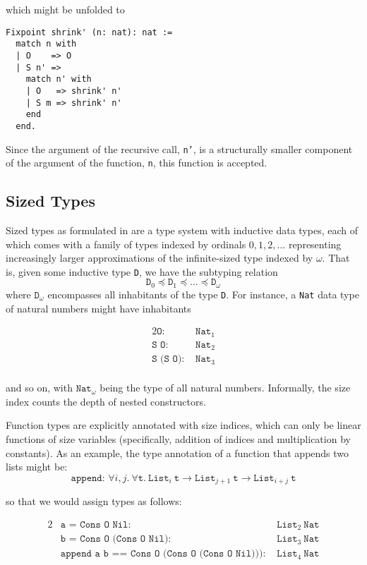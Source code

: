 \documentclass{article}
\begin{document}
which might be unfolded to

\begin{verbatim}
Fixpoint shrink' (n: nat): nat :=
  match n with
  | O    => O
  | S n' =>
    match n' with
    | O   => shrink' n'
    | S m => shrink' n'
    end
  end.
\end{verbatim}

Since the argument of the recursive call, \texttt{n'}, is a structurally smaller component of the argument of the function, \texttt{n}, this function is accepted.

\subsection{Sized Types}
Sized types as formulated in \cite{hughes} are a type system with inductive data types, each of which comes with a family of types indexed by ordinals $0, 1, 2, \dots$ representing increasingly larger approximations of the infinite-sized type indexed by $\omega$. That is, given some inductive type \texttt{D}, we have the subtyping relation
    $$\texttt{D}_0 \preceq \texttt{D}_1 \preceq \dots \preceq \texttt{D}_\omega$$
where $\texttt{D}_\omega$ encompasses all inhabitants of the type \texttt{D}. For instance, a \texttt{Nat} data type of natural numbers might have inhabitants

\begin{alignat*}{2}
    \texttt{O: }        &\texttt{Nat}_1\\
    \texttt{S O: }      &\texttt{Nat}_2\\
    \texttt{S (S O): }  &\texttt{Nat}_3\\
\end{alignat*}

and so on, with $\texttt{Nat}_\omega$ being the type of all natural numbers. Informally, the size index counts the depth of nested constructors.

Function types are explicitly annotated with size indices, which can only be linear functions of size variables (specifically, addition of indices and multiplication by constants). As an example, the type annotation of a function that appends two lists might be:
$$\texttt{append: } \forall i, j.\ \forall \texttt{t}.\ \texttt{List}_i\ \texttt{t} \rightarrow \texttt{List}_{j + 1}\ \texttt{t} \rightarrow \texttt{List}_{i + j}\ \texttt{t}$$

so that we would assign types as follows:

\begin{alignat*}{2}
    &\texttt{a = Cons O Nil: }           &\texttt{List}_2\ \texttt{Nat}\\
    &\texttt{b = Cons O (Cons O Nil): }  &\texttt{List}_3\ \texttt{Nat}\\
    &\texttt{append a b == Cons O (Cons O (Cons O Nil))): }  &\texttt{List}_4\ \texttt{Nat}
\end{alignat*}
\end{document}
